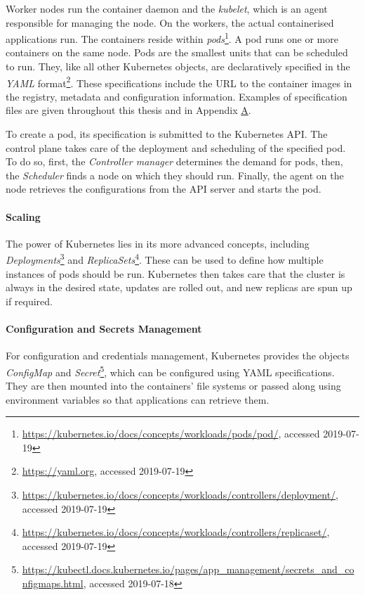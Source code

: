 Worker nodes run the container daemon and the \textit{kubelet}, which is an agent responsible for managing the node. On the workers, the actual containerised applications run. The containers reside within \textit{pods}\footnote{\url{https://kubernetes.io/docs/concepts/workloads/pods/pod/}, accessed 2019-07-19}. A pod runs one or more containers on the same node. Pods are the smallest units that can be scheduled to run. They, like all other Kubernetes objects, are declaratively specified in the \textit{YAML} format\footnote{\url{https://yaml.org}, accessed 2019-07-19}. These specifications include the URL to the container images in the registry, metadata and configuration information. Examples of specification files are given throughout this thesis and in Appendix \hyperref[apx:A]{A}. 

To create a pod, its specification is submitted to the Kubernetes API. The control plane takes care of the deployment and scheduling of the specified pod. To do so, first, the \textit{Controller manager} determines the demand for pods, then, the \textit{Scheduler} finds a node on which they should run. Finally, the  agent on the node retrieves the configurations from the API server and starts the pod. 

\paragraph{Scaling}

The power of Kubernetes lies in its more advanced concepts, including \textit{Deployments}\footnote{\url{https://kubernetes.io/docs/concepts/workloads/controllers/deployment/}, \\ accessed 2019-07-19} and \textit{ReplicaSets}\footnote{\url{https://kubernetes.io/docs/concepts/workloads/controllers/replicaset/}, \\ accessed 2019-07-19}. These can be used to define how multiple instances of pods should be run. Kubernetes then takes care that the cluster is always in the desired state, updates are rolled out, and new replicas are spun up if required.

\paragraph{Configuration and Secrets Management}

For configuration and credentials management, Kubernetes provides the objects \textit{ConfigMap} and \textit{Secret}\footnote{\url{https://kubectl.docs.kubernetes.io/pages/app_management/secrets_and_configmaps.html}, accessed 2019-07-18}, which can be configured using YAML specifications. They are then mounted into the containers' file systems or passed along using environment variables so that applications can retrieve them.

